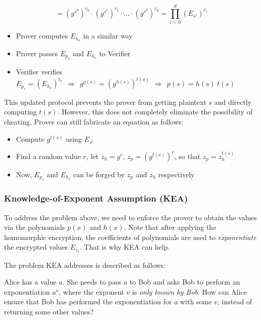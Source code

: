 \documentclass[
]{report}
\begin{document}
\[= \left( g^{s^{0}} \right)^{c_{0}} \cdot \left( g^{s^{1}} \right)^{c_{1}} \cdot \ldots \cdot \left( g^{s^{d}} \right)^{c_{d}} = \prod_{i = 0}^{d}\left( E_{s^{i}} \right)^{c_{i}}\]

\begin{itemize}
\item
  Prover computes \(E_{h_{s}}\) in a similar way
\item
  Prover passes \(E_{p_{s}}\) and \(E_{h_{s}}\) to Verifier
\item
  Verifier verifies
  \(E_{p_{s}} = \left( E_{h_{s}} \right)^{t_{s}}\mathbf{\ \  \Rightarrow \ \ }g^{p(s)} = \left( g^{h(s)} \right)^{t(s)}\mathbf{\ \  \Rightarrow \ \ }p(s) = h(s)\ t(s)\)
\end{itemize}

This updated protocol prevents the prover from getting plaintext \(s\)
and directly computing \(t(s)\). However, this does not completely
eliminate the possibility of cheating. Prover can still fabricate an
equation as follows:

\begin{itemize}
\item
  Compute \(g^{t(s)}\) using \(E_{s^{i}}\)
\item
  Find a random value \(r\), let \(z_{h} = g^{r}\),
  \(z_{p} = \left( g^{t(s)} \right)^{r}\), so that
  \(z_{p} = z_{h}^{t(s)}\)
\item
  Now, \(E_{p_{s}}\) and \(E_{h_{s}}\) can be forged by \(z_{p}\) and
  \(z_{h}\) respectively
\end{itemize}

\subsubsection{Knowledge-of-Exponent Assumption (KEA)}

To address the problem above, we need to enforce the prover to obtain
the values via the polynomials \(p(x)\) and \(h(x)\). Note that after
applying the homomorphic encryption, the coefficients of polynomials are
used to \emph{exponentiate} the encrypted values \(E_{s_{i}}\). That is
why KEA can help.

The problem KEA addresses is described as follows:

Alice has a value \(a\). She needs to pass \(a\) to Bob and asks Bob to
perform an exponentiation \(a^{v}\), where the exponent \(v\) is
\emph{only known by Bob}. How can Alice ensure that Bob has performed
the exponentiation for \(a\) with some \(v\), instead of returning some
other values?
\end{document}
